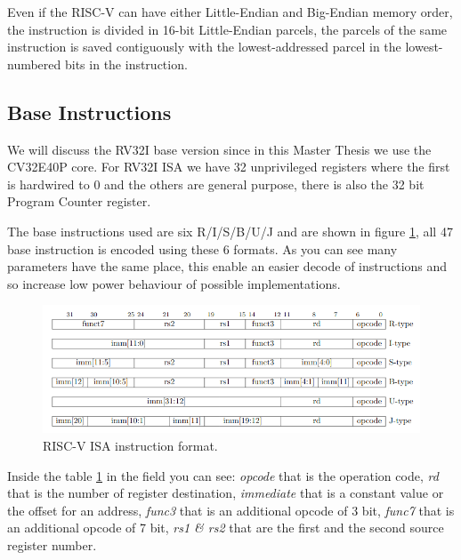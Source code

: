 {{		Even if the RISC-V can have either Little-Endian and Big-Endian memory order, the instruction is divided in 16-bit Little-Endian parcels, the parcels of the same instruction is saved contiguously with the lowest-addressed parcel in the lowest-numbered bits in the instruction.
		
		\subsection{Base Instructions}{
		    We will discuss the RV32I base version since in this Master Thesis we use the CV32E40P core.
		    For RV32I  ISA we have 32 unprivileged registers where the first is hardwired to 0 and the others are general purpose, there is also the 32 bit Program Counter register.
		    
		    The base instructions used are six R/I/S/B/U/J and are shown in figure \ref{fig:riscv_instruction_format}, all 47 base instruction is encoded using these 6 formats.
		    As you can see many parameters have the same place, this enable an easier decode of instructions and so increase low power behaviour of possible implementations.
    	    \begin{figure}[H]
    			\centering
    			\includegraphics[scale=0.55,center]{./images/riscv_instruction_format.png}
    			\caption{RISC-V ISA instruction format.}
    			\label{fig:riscv_instruction_format}
    		\end{figure}
    		
    		Inside the table \ref{fig:riscv_instruction_format} in the field you can see: \textit{opcode} that is the operation code, \textit{rd} that is the number of register destination, \textit{immediate} that is a constant value or the offset for an address, \textit{func3} that is an additional opcode of 3 bit, \textit{func7} that is an additional opcode of 7 bit, \textit{rs1 \& rs2} that are the first and the second source register number.\\
		}%
		
}}

